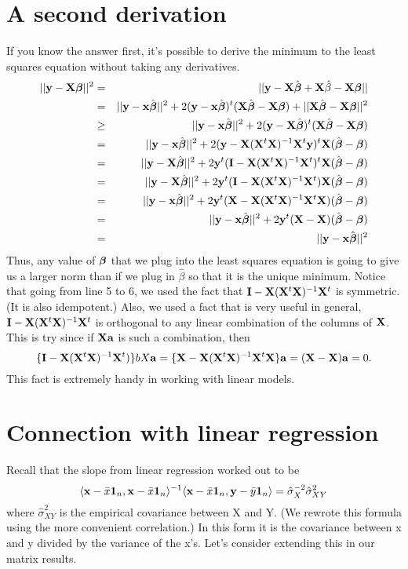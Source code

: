 \section{A second derivation}
If you know the answer first, it's possible to derive the 
minimum to the least squares equation without taking any derivatives.
\begin{eqnarray*}
|| \by - \bX \bbeta ||^2 &=& || \by - \bX \hat \bbeta + \bX\hat \beta - \bX \bbeta || \\
& = & ||\by - \bx \hat \bbeta||^2
+ 2 (\by - \bx \hat \bbeta)^t (\bX \hat \bbeta - \bX \bbeta)
+ ||\bX \hat \bbeta - \bX \bbeta||^2 \\
& \geq & ||\by - \bx \hat \bbeta||^2
+ 2 (\by - \bX \hat \bbeta)^t (\bX \hat \bbeta - \bX \bbeta) \\
& = & ||\by - \bx \hat \bbeta||^2
+ 2 (\by - \yhat)^t \bX (\hat \bbeta - \bbeta) \\
& = & ||\by - \bX \hat \bbeta||^2
+ 2 \by^t(\bI - \hatmat )^t \bX (\hat \bbeta - \bbeta) \\
& = & ||\by - \bX \hat \bbeta||^2
+ 2 \by^t(\bI - \hatmat ) \bX (\hat \bbeta - \bbeta) \\
& = & ||\by - \bx \hat \bbeta||^2
+ 2 \by^t(\bX - \hatmat \bX )(\hat \bbeta - \bbeta) \\
& = & ||\by - \bx \hat \bbeta||^2
+ 2 \by^t(\bX - \bX )(\hat \bbeta - \bbeta) \\
& = & ||\by - \bx \hat \bbeta||^2
\end{eqnarray*}
Thus, any value of $\bbeta$ that we plug into the least squares equation
is going to give us a larger norm than if we plug in $\hat \beta$ so that
it is the unique minimum.
Notice that going from line 5 to 6, we used the fact that $\bI - \hatmat$ is symmetric. (It is also idempotent.) Also, we used a fact that is very
useful in general, $\bI - \hatmat$ is orthogonal to any linear combination
of the columns of $\bX$. This is try since if $\bX \ba$ is such a combination,
then
$$
\{\bI - \hatmat)\}bX \ba = \{\bX - \hatmat \bX\}\ba = (\bX - \bX) \ba = 0.
$$
This fact is extremely handy in working with linear models. 

\section{Connection with linear regression}
\label{sec:lslin}
Recall that the slope from linear regression worked out to be
$$
\ip{\bx - \bar x \bone_n}{\bx - \bar x \bone_n}^{-1}\ip{\bx - \bar x\bone_n}{\by - \bar y \bone_n} 
= \hat \sigma^{-2}_{X} \hat \sigma^2_{XY}
$$
where $\hat \sigma^2_{XY}$ is the empirical covariance between X and Y. 
(We rewrote this formula using the more convenient correlation.) In this form it is the
covariance between x and y divided by the variance of the x's. Let's consider
extending this in our matrix results.

